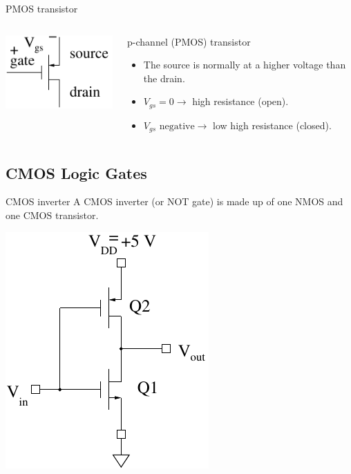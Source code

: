 \begin{frame}{PMOS transistor}
  \begin{columns}
    \begin{column}{3cm}
      \includegraphics{PMOSAnnotated}
    \end{column}
    \begin{column}{7cm}
      p-channel (PMOS) transistor
      \begin{itemize}
        \item The source is normally at a higher voltage than the drain.
        \item $V_{gs} = 0 \rightarrow$  high resistance (open).
        \item $V_{gs} \text{ negative} \rightarrow$ low high resistance (closed).
      \end{itemize}
    \end{column}
  \end{columns}
\end{frame}

\subsection{CMOS Logic Gates}

\begin{frame}{CMOS inverter}
  A CMOS inverter (or NOT gate) is made up of one NMOS and one CMOS transistor.
  \begin{center}
    \includegraphics{CMOSInverter}
  \end{center}
\end{frame}

